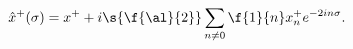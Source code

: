 \begin{equation}
\hat{x}^+(\sigma)=x^++i\s{\f{\al}{2}}\sum_{n\neq 0}
\f{1}{n}x^+_n e^{-2in\sigma}. 
\end{equation}

